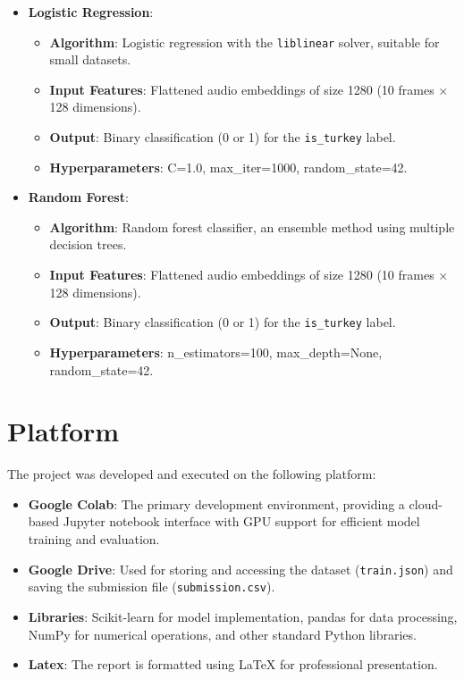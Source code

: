 \documentclass[12pt, a4paper]{article}
\begin{document}
\begin{itemize}
    \item \textbf{Logistic Regression}:
        \begin{itemize}
            \item \textbf{Algorithm}: Logistic regression with the \texttt{liblinear} solver, suitable for small datasets.
            \item \textbf{Input Features}: Flattened audio embeddings of size 1280 (10 frames $\times$ 128 dimensions).
            \item \textbf{Output}: Binary classification (0 or 1) for the \texttt{is\_turkey} label.
            \item \textbf{Hyperparameters}: C=1.0, max\_iter=1000, random\_state=42.
        \end{itemize}
    \item \textbf{Random Forest}:
        \begin{itemize}
            \item \textbf{Algorithm}: Random forest classifier, an ensemble method using multiple decision trees.
            \item \textbf{Input Features}: Flattened audio embeddings of size 1280 (10 frames $\times$ 128 dimensions).
            \item \textbf{Output}: Binary classification (0 or 1) for the \texttt{is\_turkey} label.
            \item \textbf{Hyperparameters}: n\_estimators=100, max\_depth=None, random\_state=42.
        \end{itemize}
\end{itemize}

\section{Platform}
The project was developed and executed on the following platform:

\begin{itemize}
    \item \textbf{Google Colab}: The primary development environment, providing a cloud-based Jupyter notebook interface with GPU support for efficient model training and evaluation.
    \item \textbf{Google Drive}: Used for storing and accessing the dataset (\texttt{train.json}) and saving the submission file (\texttt{submission.csv}).
    \item \textbf{Libraries}: Scikit-learn for model implementation, pandas for data processing, NumPy for numerical operations, and other standard Python libraries.
    \item \textbf{Latex}: The report is formatted using LaTeX for professional presentation.
\end{itemize}
\end{document}
